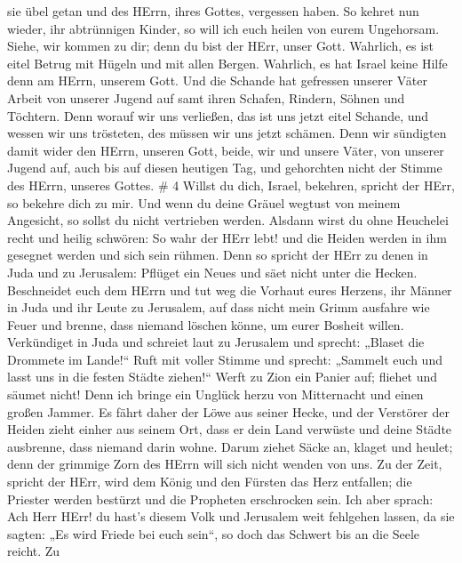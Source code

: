 sie übel getan und des HErrn, ihres Gottes, vergessen haben.
 So kehret nun wieder, ihr abtrünnigen Kinder, so will ich
euch heilen von eurem Ungehorsam. Siehe, wir kommen zu dir; denn du bist
der HErr, unser Gott.  Wahrlich, es ist eitel Betrug mit
Hügeln und mit allen Bergen. Wahrlich, es hat Israel keine Hilfe denn am
HErrn, unserem Gott.  Und die Schande hat gefressen unserer
Väter Arbeit von unserer Jugend auf samt ihren Schafen, Rindern, Söhnen
und Töchtern.  Denn worauf wir uns verließen, das ist uns
jetzt eitel Schande, und wessen wir uns trösteten, des müssen wir uns
jetzt schämen. Denn wir sündigten damit wider den HErrn, unseren Gott,
beide, wir und unsere Väter, von unserer Jugend auf, auch bis auf diesen
heutigen Tag, und gehorchten nicht der Stimme des HErrn, unseres Gottes.
\# 4  Willst du dich, Israel, bekehren, spricht der HErr, so
bekehre dich zu mir. Und wenn du deine Gräuel wegtust von meinem
Angesicht, so sollst du nicht vertrieben werden.  Alsdann
wirst du ohne Heuchelei recht und heilig schwören: So wahr der HErr
lebt! und die Heiden werden in ihm gesegnet werden und sich sein rühmen.
 Denn so spricht der HErr zu denen in Juda und zu Jerusalem:
Pflüget ein Neues und säet nicht unter die Hecken. 
Beschneidet euch dem HErrn und tut weg die Vorhaut eures Herzens, ihr
Männer in Juda und ihr Leute zu Jerusalem, auf dass nicht mein Grimm
ausfahre wie Feuer und brenne, dass niemand löschen könne, um eurer
Bosheit willen.  Verkündiget in Juda und schreiet laut zu
Jerusalem und sprecht: „Blaset die Drommete im Lande!{}`` Ruft mit
voller Stimme und sprecht: „Sammelt euch und lasst uns in die festen
Städte ziehen!{}``  Werft zu Zion ein Panier auf; fliehet
und säumet nicht! Denn ich bringe ein Unglück herzu von Mitternacht und
einen großen Jammer.  Es fährt daher der Löwe aus seiner
Hecke, und der Verstörer der Heiden zieht einher aus seinem Ort, dass er
dein Land verwüste und deine Städte ausbrenne, dass niemand darin wohne.
 Darum ziehet Säcke an, klaget und heulet; denn der grimmige
Zorn des HErrn will sich nicht wenden von uns.  Zu der Zeit,
spricht der HErr, wird dem König und den Fürsten das Herz entfallen; die
Priester werden bestürzt und die Propheten erschrocken sein.
 Ich aber sprach: Ach Herr HErr! du hast's diesem Volk und
Jerusalem weit fehlgehen lassen, da sie sagten: „Es wird Friede bei euch
sein``, so doch das Schwert bis an die Seele reicht.  Zu

